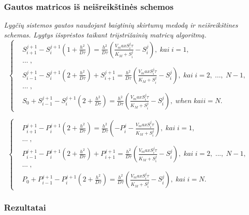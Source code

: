 \documentclass[12pt, a4paper, lithuanian]{article}
\begin{document}
\subsubsection{Gautos matricos iš neišreikštinės schemos}
\textit{Lygčių sistemos gautos naudojant baigtinių skirtumų medodą ir neišreikštines schemas. Lygtys išsprėstos taikant triįstrižainių matricų algoritmą.}
\begin{equation}
\left\{
\begin{aligned}
    &S_{i+1}^{j+1}-S_i^{j+1}\left(1+\frac{h^2}{D\tau}\right)
        = \frac{h^2}{D\tau} \left(\frac{V_maxS_i^j\tau}{K_M+S_i^j}-S_i^j\right),\; kai \; i = 1,\\
    &\dots\;,\\
    &S_{i-1}^{j+1}-S_i^{j+1}\left(2+\frac{h^2}{D\tau}\right)+S_{i+1}^{j+1}
        = \frac{h^2}{D\tau}
        \left(\frac{V_maxS_i^j\tau}{K_M+S_i^j}-S_i^j\right),\; kai\; i =
        2,\;...,\;N-1,\\
    &\dots\;,\\
    &S_0 + S_{i-1}^{j+1} - S_i^{j+1}\left(2+\frac{h^2}{D\tau}\right)
        =  \frac{h^2}{D\tau}
        \left(\frac{V_maxS_i^j\tau}{K_M+S_i^j}-S_i^j\right),\; when \; kai i = N.
\end{aligned}
\right.
\end{equation}

\begin{equation}
\left\{
\begin{aligned}
    &P_{i+1}^{j+1}-P_i^{j+1}\left(2+\frac{h^2}{D\tau}\right)
        = \frac{h^2}{D\tau} \left(-P_i^j -\frac{V_maxS_i^j\tau}{K_M+S_i^j}\right),\; kai \; i = 1,\\
    &\dots\;,\\
    &P_{i-1}^{j+1}-P_i^{j+1}\left(2+\frac{h^2}{D\tau}\right)+P_{i+1}^{j+1}
        = \frac{h^2}{D\tau}
        \left(\frac{V_maxS_i^j\tau}{K_M+S_i^j}-S_i^j\right),\; kai\; i =
        2,\;...,\;N-1,\\
    &\dots\;,\\
    &P_0 + P_{i-1}^{j+1} - P_i^{j+1}\left(2+\frac{h^2}{D\tau}\right)
        =  \frac{h^2}{D\tau}
        \left(\frac{V_maxS_i^j\tau}{K_M+S_i^j}-S_i^j\right),\; kai\; i = N.
\end{aligned}
\right.
\end{equation}

\subsubsection{Rezultatai}
\end{document}
